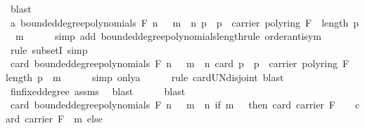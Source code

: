 \begin{isabellebody}
\ blast\isanewline
\ \ \isamarkupfalse%
\ a{\isacharcolon}{\kern0pt}\ {\isachardoublequoteopen}bounded{\isacharunderscore}{\kern0pt}degree{\isacharunderscore}{\kern0pt}polynomials\ F\ n\ {\isacharequal}{\kern0pt}\ {\isacharparenleft}{\kern0pt}{\isasymUnion}\ m\ {\isasymle}\ n{\isachardot}{\kern0pt}\ {\isacharbraceleft}{\kern0pt}p{\isachardot}{\kern0pt}\ \ p\ {\isasymin}\ carrier\ {\isacharparenleft}{\kern0pt}poly{\isacharunderscore}{\kern0pt}ring\ F{\isacharparenright}{\kern0pt}\ {\isasymand}\ length\ p\ {\isacharequal}{\kern0pt}\ m{\isacharbraceright}{\kern0pt}{\isacharparenright}{\kern0pt}{\isachardoublequoteclose}\isanewline
\ \ \ \ \isamarkupfalse%
\ {\isacharparenleft}{\kern0pt}simp\ add{\isacharcolon}{\kern0pt}\ bounded{\isacharunderscore}{\kern0pt}degree{\isacharunderscore}{\kern0pt}polynomials{\isacharunderscore}{\kern0pt}length{\isacharcomma}{\kern0pt}rule\ order{\isacharunderscore}{\kern0pt}antisym{\isacharparenright}{\kern0pt}\isanewline
\ \ \ \ \isamarkupfalse%
\ {\isacharparenleft}{\kern0pt}rule\ subsetI{\isacharcomma}{\kern0pt}\ simp{\isacharparenright}{\kern0pt}{\isacharplus}{\kern0pt}\isanewline
\ \ \isamarkupfalse%
\ {\isachardoublequoteopen}card\ {\isacharparenleft}{\kern0pt}bounded{\isacharunderscore}{\kern0pt}degree{\isacharunderscore}{\kern0pt}polynomials\ F\ n{\isacharparenright}{\kern0pt}\ {\isacharequal}{\kern0pt}\ {\isacharparenleft}{\kern0pt}{\isasymSum}\ m\ {\isasymle}\ n{\isachardot}{\kern0pt}\ card\ {\isacharbraceleft}{\kern0pt}p{\isachardot}{\kern0pt}\ \ p\ {\isasymin}\ carrier\ {\isacharparenleft}{\kern0pt}poly{\isacharunderscore}{\kern0pt}ring\ F{\isacharparenright}{\kern0pt}\ {\isasymand}\ length\ p\ {\isacharequal}{\kern0pt}\ m{\isacharbraceright}{\kern0pt}{\isacharparenright}{\kern0pt}{\isachardoublequoteclose}\isanewline
\ \ \ \ \isamarkupfalse%
\ {\isacharparenleft}{\kern0pt}simp\ only{\isacharcolon}{\kern0pt}a{\isacharparenright}{\kern0pt}\isanewline
\ \ \ \ \isamarkupfalse%
\ {\isacharparenleft}{\kern0pt}rule\ card{\isacharunderscore}{\kern0pt}UN{\isacharunderscore}{\kern0pt}disjoint{\isacharcomma}{\kern0pt}\ blast{\isacharparenright}{\kern0pt}\isanewline
\ \ \ \ \isamarkupfalse%
\ fin{\isacharunderscore}{\kern0pt}fixed{\isacharunderscore}{\kern0pt}degree\ assms\ \isamarkupfalse%
\ blast\isanewline
\ \ \ \ \isamarkupfalse%
\ blast\isanewline
\ \ \isamarkupfalse%
\ {\isachardoublequoteopen}card\ {\isacharparenleft}{\kern0pt}bounded{\isacharunderscore}{\kern0pt}degree{\isacharunderscore}{\kern0pt}polynomials\ F\ n{\isacharparenright}{\kern0pt}\ {\isacharequal}{\kern0pt}\ {\isacharparenleft}{\kern0pt}{\isasymSum}\ m\ {\isasymle}\ n{\isachardot}{\kern0pt}\ if\ m\ {\isasymge}\ {}\ then\ {\isacharparenleft}{\kern0pt}card\ {\isacharparenleft}{\kern0pt}carrier\ F{\isacharparenright}{\kern0pt}\ {\isacharminus}{\kern0pt}\ {}{\isacharparenright}{\kern0pt}\ {\isacharasterisk}{\kern0pt}\ card\ {\isacharparenleft}{\kern0pt}carrier\ F{\isacharparenright}{\kern0pt}\ {\isacharcircum}{\kern0pt}\ {\isacharparenleft}{\kern0pt}m{\isacharminus}{\kern0pt}{}{\isacharparenright}{\kern0pt}\ else\ {}{\isacharparenright}{\kern0pt}{\isachardoublequoteclose}\isanewline

\end{isabellebody}
